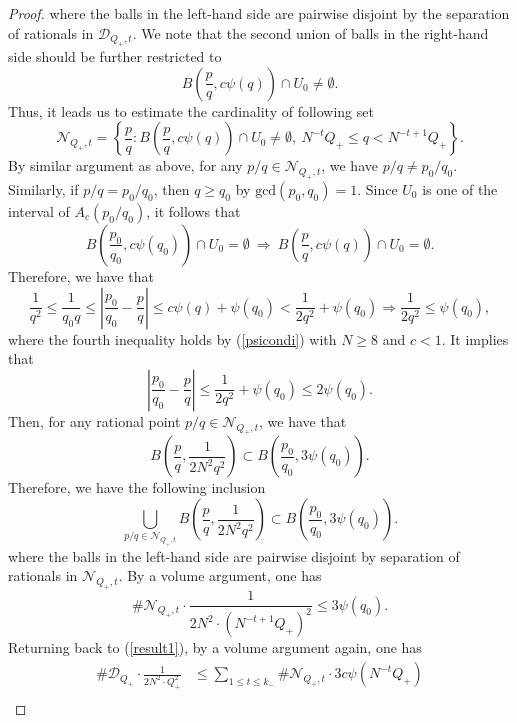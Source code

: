 \documentclass[11pt]{amsart}
\numberwithin{equation}{section}
\newcommand{\0}{\mathbf{0}}
\theoremstyle{remark}
\begin{document}
{\begin{proof}
    where the balls in the left-hand side are pairwise disjoint by the separation of rationals in $\mathcal{D}_{Q_+,t}$. We note that the second union of balls in the right-hand side should be further restricted to
    $$B\left(\frac{p}{q},c\psi(q)\right)\cap U_0\neq\emptyset.$$
    Thus, it leads us to estimate the cardinality of following set
    $$\mathcal{N}_{Q_+,t}=\left\{\frac{p}{q}:B\left(\frac{p}{q},c\psi(q)\right)\cap U_0\neq\emptyset, \ N^{-t}Q_+\le q< N^{-t+1}Q_+\right\}.$$
    By similar argument as above, for any $p/q\in\mathcal{N}_{Q_+,t}$, we have $p/q\neq p_0/q_0.$ Similarly, if $p/q= p_0/q_0$, then $q\ge q_0$ by $\textrm{gcd}(p_0,q_0)=1$. Since $U_0$ is one of the interval of $A_{c}(p_0/q_0)$, it follows that
    $$B\left(\frac{p_0}{q_0},c\psi(q_0)\right)\cap U_0=\emptyset\ \Longrightarrow\ B\left(\frac{p}{q},c\psi(q)\right)\cap U_0=\emptyset.$$
    Therefore, we have that
    $$\frac{1}{q^{2}}\le\frac{1}{q_0q}\le \left|\frac{p_0}{q_0}-\frac{p}{q}\right|\le c\psi(q)+\psi(q_0)<\frac{1}{2q^{2}}+\psi(q_0)\Longrightarrow \frac{1}{2q^{2}}\le \psi(q_0),$$
    where the fourth inequality holds by (\ref{psicondi}) with $N\ge 8$ and $c<1$.
    It implies that
    $$\left|\frac{p_0}{q_0}-\frac{p}{q}\right|\le 
    \frac{1}{2q^{2}}+\psi(q_0)\le 2\psi(q_0).$$
    Then, for any rational point $p/q\in\mathcal{N}_{Q_+,t}$, we have that
    $$B\left(\frac{p}{q},\frac{1}{2N^2q^2}\right)\subset B\left(\frac{p_0}{q_0},3\psi(q_0)\right).$$
    Therefore, we have the following inclusion
    $$\bigcup_{{p}/{q}\in\mathcal{N}_{Q_+,t}}B\left(\frac{p}{q},\frac{1}{2N^2q^{2}}\right)\subset B\left(\frac{p_0}{q_0},3\psi(q_0)\right).$$
    where the balls in the left-hand side are pairwise disjoint by separation of rationals in $\mathcal{N}_{Q_+,t}$. By a volume argument, one has
    $$\#\mathcal{N}_{Q_+,t}\cdot \frac{1}{2N^2\cdot (N^{-t+1}Q_+)^2}\le 3\psi(q_0).$$
    Returning back to (\ref{result1}), by a volume argument again, one has
    \begin{align*}
         \#\mathcal{D}_{Q_+}\cdot\frac{1}{2N^2\cdot Q_+^2}&\le \sum_{1\le t\le k_-}\#\mathcal{N}_{Q_+,t}\cdot 3c\psi(N^{-t}Q_+)\\

\end{align*}
\end{proof}}
\end{document}
